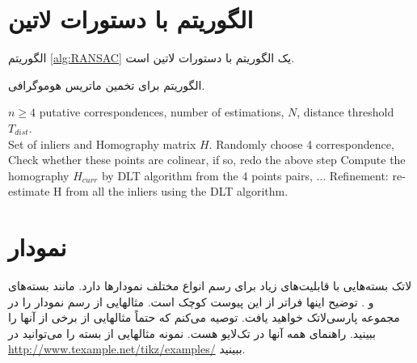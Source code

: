 \section{الگوریتم با دستورات لاتین}
الگوریتم \ref{alg:RANSAC} یک الگوریتم با دستورات لاتین است.

\begin{algorithm}[t]
\onehalfspacing
\caption{الگوریتم  برای تخمین ماتریس هوموگرافی.} \label{alg:RANSAC}
\begin{latin}
\begin{algorithmic}[1]
\REQUIRE $n\geq4$ putative correspondences, number of estimations, $N$, distance threshold $T_{dist}$.\\
\ENSURE Set of inliers and Homography matrix $H$.
  \STATE Randomly choose 4 correspondence,
  \STATE Check whether these points are colinear, if so, redo the above step
  \STATE Compute the homography $H_{curr}$ by DLT algorithm from the 4 points pairs,
  \STATE $\ldots$ %
  \ENDFOR
  \STATE Refinement: re-estimate H from all the inliers using the DLT algorithm.
\end{algorithmic}
\end{latin}
\end{algorithm}

\section{نمودار}
لاتک بسته‌هایی با قابلیت‌های زیاد برای رسم انواع مختلف نمودارها دارد. مانند بسته‌های  و  . توضیح اینها فراتر از این پیوست کوچک است. مثالهایی از رسم نمودار را در مجموعه پارسی‌لاتک خواهید یافت. توصیه می‌کنم که حتماً مثالهایی از برخی از آنها را ببینید. راهنمای همه آنها در تک‌لایو هست. نمونه مثالهایی از بسته  را می‌توانید در \url{http://www.texample.net/tikz/examples/} ببینید.

